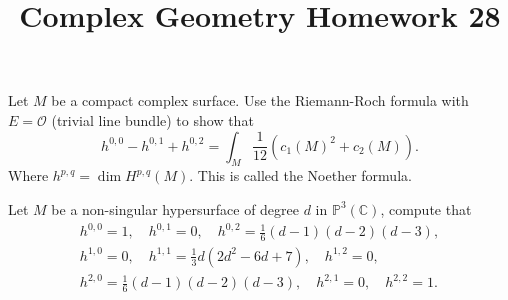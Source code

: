 \documentclass[12pt]{article}
\title{Complex Geometry Homework 28}
\author{}
\date{}
\begin{document}
\maketitle
\begin{problem}
  Let \(M\) be a compact complex surface. Use the Riemann-Roch formula with
  \(E=\mathcal{O}\) (trivial line bundle) to show that \[
    h^{0,0}-h^{0,1}+h^{0,2}=\int_{M}\frac{1}{12}(c_1(M)^2+c_2(M))
  .\] Where \(h^{p,q}=\dim H^{p,q}(M)\). This is called the Noether formula.
\end{problem}
\begin{problem}
  Let \(M\) be a non-singular hypersurface of degree \(d\) in
  \(\mathbb{P}^3(\mathbb{C})\), compute that 
  \begin{gather*}
    h^{0,0}=1,\quad h^{0,1}=0,\quad h^{0,2}=\frac{1}{6}(d-1)(d-2)(d-3), \\
    h^{1,0}=0,\quad h^{1,1}=\frac{1}{3}d(2d^2-6d+7),\quad h^{1,2}=0, \\
    h^{2,0}=\frac{1}{6}(d-1)(d-2)(d-3),\quad h^{2,1}=0,\quad h^{2,2}=1.
  \end{gather*}
\end{problem}
\end{document}

